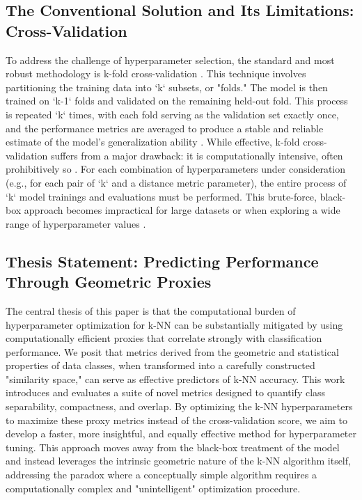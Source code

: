 \documentclass[conference]{IEEEtran}
\begin{document}
\subsection{The Conventional Solution and Its Limitations: Cross-Validation}
To address the challenge of hyperparameter selection, the standard and most robust methodology is k-fold cross-validation \cite{b12, b13, b14}. This technique involves partitioning the training data into `k` subsets, or "folds." The model is then trained on `k-1` folds and validated on the remaining held-out fold. This process is repeated `k` times, with each fold serving as the validation set exactly once, and the performance metrics are averaged to produce a stable and reliable estimate of the model's generalization ability \cite{b13, b15}. While effective, k-fold cross-validation suffers from a major drawback: it is computationally intensive, often prohibitively so \cite{b11, b13}. For each combination of hyperparameters under consideration (e.g., for each pair of `k` and a distance metric parameter), the entire process of `k` model trainings and evaluations must be performed. This brute-force, black-box approach becomes impractical for large datasets or when exploring a wide range of hyperparameter values \cite{b16, b17}.

\subsection{Thesis Statement: Predicting Performance Through Geometric Proxies}
The central thesis of this paper is that the computational burden of hyperparameter optimization for k-NN can be substantially mitigated by using computationally efficient proxies that correlate strongly with classification performance. We posit that metrics derived from the geometric and statistical properties of data classes, when transformed into a carefully constructed "similarity space," can serve as effective predictors of k-NN accuracy. This work introduces and evaluates a suite of novel metrics designed to quantify class separability, compactness, and overlap. By optimizing the k-NN hyperparameters to maximize these proxy metrics instead of the cross-validation score, we aim to develop a faster, more insightful, and equally effective method for hyperparameter tuning. This approach moves away from the black-box treatment of the model and instead leverages the intrinsic geometric nature of the k-NN algorithm itself, addressing the paradox where a conceptually simple algorithm requires a computationally complex and "unintelligent" optimization procedure.
\end{document}
